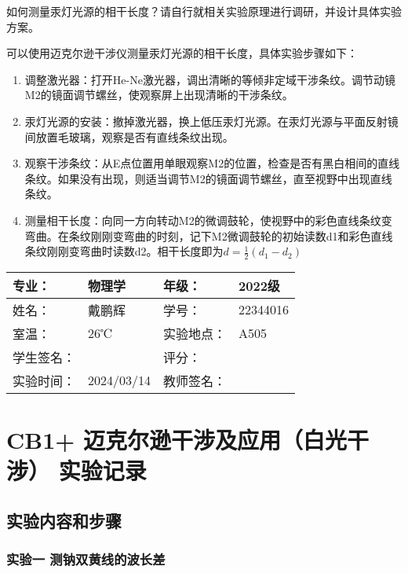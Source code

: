 \documentclass[dvipsnames, svgnames,a4paper,11pt]{article}
\begin{document}
	\begin{question}
		如何测量汞灯光源的相干长度？请自行就相关实验原理进行调研，并设计具体实验方案。
	\end{question}
		
		可以使用迈克尔逊干涉仪测量汞灯光源的相干长度，具体实验步骤如下：
		\begin{enumerate}
			\item 调整激光器：打开He-Ne激光器，调出清晰的等倾非定域干涉条纹。调节动镜M2的镜面调节螺丝，使观察屏上出现清晰的干涉条纹。
			\item 汞灯光源的安装：撤掉激光器，换上低压汞灯光源。在汞灯光源与平面反射镜间放置毛玻璃，观察是否有直线条纹出现。
			\item 观察干涉条纹：从E点位置用单眼观察M2的位置，检查是否有黑白相间的直线条纹。如果没有出现，则适当调节M2的镜面调节螺丝，直至视野中出现直线条纹。
			\item 测量相干长度：向同一方向转动M2的微调鼓轮，使视野中的彩色直线条纹变弯曲。在条纹刚刚变弯曲的时刻，记下M2微调鼓轮的初始读数d1和彩色直线条纹刚刚变弯曲时读数d2。相干长度即为$d=\frac{1}{2}(d_1-d_2)$
		\end{enumerate}
		

\clearpage
\begin{table}
	\renewcommand\arraystretch{1.7}
	\centering
	\begin{tabularx}{\textwidth}{|X|X|X|X|}
	\hline
	专业：& 物理学 &年级：& 2022级 \\
	\hline
	姓名：& 戴鹏辉 & 学号：& 22344016 \\
	\hline
	室温：& 26℃ & 实验地点： & A505 \\
	\hline
	学生签名：& & 评分： &\\
	\hline
	实验时间：& 2024/03/14 & 教师签名：&\\
	\hline
	\end{tabularx}
\end{table}

\section{CB1+ \quad 迈克尔逊干涉及应用（白光干涉） \quad\heiti 实验记录}
\subsection{实验内容和步骤}

	\subsubsection{实验一 测钠双黄线的波长差}
	
\end{document}
